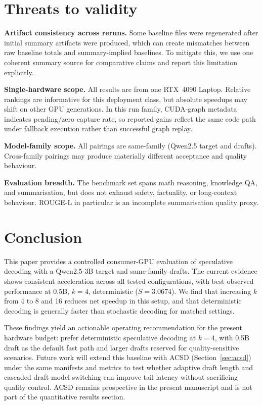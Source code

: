 \section{Threats to validity}
\label{sec:threats}

\textbf{Artifact consistency across reruns.}
Some baseline files were regenerated after initial summary artifacts were
produced, which can create mismatches between raw baseline totals and
summary-implied baselines. To mitigate this, we use one coherent summary source
for comparative claims and report this limitation explicitly.

\textbf{Single-hardware scope.}
All results are from one RTX~4090 Laptop. Relative rankings are informative for this
deployment class, but absolute speedups may shift on other GPU generations.
In this run family, CUDA-graph metadata indicates pending/zero capture rate,
so reported gains reflect the same code path under fallback execution rather
than successful graph replay.

\textbf{Model-family scope.}
All pairings are same-family (Qwen2.5 target and drafts). Cross-family
pairings may produce materially different acceptance and quality behaviour.

\textbf{Evaluation breadth.}
The benchmark set spans math reasoning, knowledge QA, and summarisation, but
does not exhaust safety, factuality, or long-context behaviour. ROUGE-L in
particular is an incomplete summarisation quality proxy.

\section{Conclusion}
\label{sec:conclusion}

This paper provides a controlled consumer-GPU evaluation of speculative
decoding with a Qwen2.5-3B target and same-family drafts. The current evidence
shows consistent acceleration across all tested configurations, with best
observed performance at 0.5B, $k{=}4$, deterministic
($S{=}3.0674$). We find that increasing $k$ from 4 to 8 and 16 reduces net
speedup in this setup, and that deterministic decoding is generally faster than
stochastic decoding for matched settings.

These findings yield an actionable operating recommendation for the present
hardware budget: prefer deterministic speculative decoding at $k{=}4$, with
0.5B draft as the default fast path and larger drafts reserved for
quality-sensitive scenarios. Future work will
extend this baseline with ACSD (Section~\ref{sec:acsd}) under the same
manifests and metrics to test whether adaptive draft length and cascaded
draft-model switching can improve tail latency without sacrificing quality
control. ACSD remains prospective in the present manuscript and is not part of
the quantitative results section.
